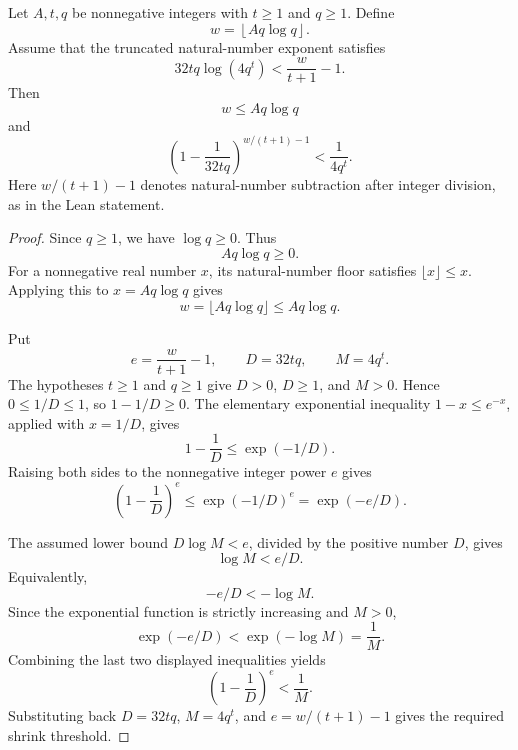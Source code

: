 \begin{helper}
Let \(A,t,q\) be nonnegative integers with \(t\ge1\) and \(q\ge1\).  Define
\[
  w=\left\lfloor A q\log q\right\rfloor .
\]
Assume that the truncated natural-number exponent satisfies
\[
  32tq\log(4q^t)<\frac{w}{t+1}-1 .
\]
Then
\[
  w\le A q\log q
\]
and
\[
  \left(1-\frac{1}{32tq}\right)^{w/(t+1)-1}
  <\frac{1}{4q^t}.
\]
Here \(w/(t+1)-1\) denotes natural-number subtraction after integer division,
as in the Lean statement.
\end{helper}
\begin{proof}
Since \(q\ge1\), we have \(\log q\ge0\).  Thus
\[
  A q\log q\ge0.
\]
For a nonnegative real number \(x\), its natural-number floor satisfies
\(\lfloor x\rfloor\le x\).  Applying this to \(x=Aq\log q\) gives
\[
  w=\lfloor Aq\log q\rfloor\le Aq\log q.
\]

Put
\[
  e=\frac{w}{t+1}-1,\qquad D=32tq,\qquad M=4q^t.
\]
The hypotheses \(t\ge1\) and \(q\ge1\) give \(D>0\), \(D\ge1\), and
\(M>0\).  Hence \(0\le 1/D\le1\), so \(1-1/D\ge0\).  The elementary
exponential inequality \(1-x\le e^{-x}\), applied with \(x=1/D\), gives
\[
  1-\frac1D\le \exp(-1/D).
\]
Raising both sides to the nonnegative integer power \(e\) gives
\[
  \left(1-\frac1D\right)^e\le \exp(-1/D)^e
  =\exp(-e/D).
\]

The assumed lower bound \(D\log M<e\), divided by the positive number \(D\),
gives
\[
  \log M<e/D.
\]
Equivalently,
\[
  -e/D<-\log M.
\]
Since the exponential function is strictly increasing and \(M>0\),
\[
  \exp(-e/D)<\exp(-\log M)=\frac1M.
\]
Combining the last two displayed inequalities yields
\[
  \left(1-\frac1D\right)^e<\frac1M.
\]
Substituting back \(D=32tq\), \(M=4q^t\), and
\(e=w/(t+1)-1\) gives the required shrink threshold.
\end{proof}
